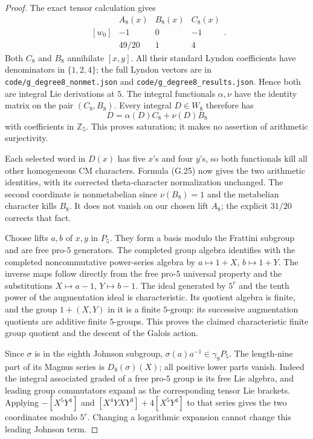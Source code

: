 \begin{proof}
The exact tensor calculation gives
\[
 \begin{array}{c|rrr}
       &A_8(x)&B_8(x)&C_8(x)\\\hline
 [w_0]&-1&0&-1\\
 [w_1]&49/20&1&4
 \end{array}.
\]
Both $C_8$ and $B_8$ annihilate $[x,y]$. All their standard
Lyndon coefficients have denominators in $\{1,2,4\}$; the full
Lyndon vectors are in \texttt{code/g\_degree8\_nonmet.json}
and \texttt{code/g\_degree8\_results.json}. Hence both are integral
Lie derivations at $5$. The integral functionals $\alpha,\nu$
have the identity matrix on the pair $(C_8,B_8)$. Every integral
$D\in W_8$ therefore has
\[
                  D=\alpha(D)C_8+\nu(D)B_8
\]
with coefficients in $\mathbb Z_5$. This proves saturation;
it makes no assertion of arithmetic surjectivity.

Each selected word in $D(x)$ has five $x$'s and four $y$'s,
so both functionals kill all other homogeneous CM characters.
Formula (G.25) now gives the two arithmetic identities, with
its corrected theta-character normalization unchanged.
The second coordinate is nonmetabelian since $\nu(B_8)=1$
and the metabelian character kills $B_8$. It does not vanish
on our chosen lift $A_8$; the explicit $31/20$ corrects that
fact.

Choose lifts $a,b$ of $x,y$ in $P_5$. They form a basis modulo
the Frattini subgroup and are free pro-$5$ generators.
The completed group algebra identifies with the completed
noncommutative power-series algebra by $a\mapsto1+X$,
$b\mapsto1+Y$. The inverse maps follow directly from the free
pro-$5$ universal property and the substitutions
$X\mapsto a-1$, $Y\mapsto b-1$.
The ideal generated by $5^r$ and the tenth power of the
augmentation ideal is characteristic. Its quotient algebra
is finite, and the group $1+(X,Y)$ in it is a finite $5$-group:
its successive augmentation quotients are additive finite
$5$-groups. This proves the claimed characteristic finite
group quotient and the descent of the Galois action.

Since $\sigma$ is in the eighth Johnson subgroup,
$\sigma(a)a^{-1}\in\gamma_9P_5$. The length-nine part of its
Magnus series is $D_8(\sigma)(X)$; all positive lower parts
vanish. Indeed the integral associated graded of a free
pro-$5$ group is its free Lie algebra, and leading group
commutators expand as the corresponding tensor Lie brackets.
Applying $-[X^5Y^4]$ and $[X^4YXY^3]+4[X^5Y^4]$ to that
series gives the two coordinates modulo $5^r$.
Changing a logarithmic expansion cannot change this leading
Johnson term.


\end{proof}

